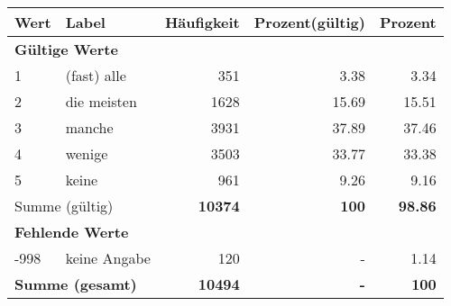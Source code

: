      \begin{longtable}{lXrrr}
     \toprule
     \textbf{Wert} & \textbf{Label} & \textbf{Häufigkeit} & \textbf{Prozent(gültig)} & \textbf{Prozent} \\
     \endhead
     \midrule
     \multicolumn{5}{l}{\textbf{Gültige Werte}}\\

     1 &
     \multicolumn{1}{X}{ (fast) alle   } &


       \num{351} &
       \num[round-mode=places,round-precision=2]{3.38} &
         \num[round-mode=places,round-precision=2]{3.34} \\

     2 &
     \multicolumn{1}{X}{ die meisten   } &


       \num{1628} &
       \num[round-mode=places,round-precision=2]{15.69} &
         \num[round-mode=places,round-precision=2]{15.51} \\

     3 &
     \multicolumn{1}{X}{ manche   } &


       \num{3931} &
       \num[round-mode=places,round-precision=2]{37.89} &
         \num[round-mode=places,round-precision=2]{37.46} \\

     4 &
     \multicolumn{1}{X}{ wenige   } &


       \num{3503} &
       \num[round-mode=places,round-precision=2]{33.77} &
         \num[round-mode=places,round-precision=2]{33.38} \\

     5 &
     \multicolumn{1}{X}{ keine   } &


       \num{961} &
       \num[round-mode=places,round-precision=2]{9.26} &
         \num[round-mode=places,round-precision=2]{9.16} \\
     \midrule
     \multicolumn{2}{l}{Summe (gültig)} &
       \textbf{\num{10374}} &
     \textbf{\num{100}} &
       \textbf{\num[round-mode=places,round-precision=2]{98.86}} \\
     \multicolumn{5}{l}{\textbf{Fehlende Werte}}\\
       -998 &
       keine Angabe &
         \num{120} &
        - &
         \num[round-mode=places,round-precision=2]{1.14} \\
     \midrule
     \multicolumn{2}{l}{\textbf{Summe (gesamt)}} &
          \textbf{\num{10494}} &
        \textbf{-} &
        \textbf{\num{100}} \\
     \bottomrule
     \end{longtable}
     
